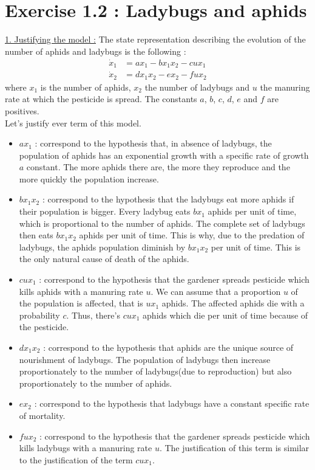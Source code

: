 \section*{Exercise 1.2 : Ladybugs and aphids}
\underline{1. Justifying the model :}
The state representation describing the evolution of the number of aphids and ladybugs is the following :
\begin{align*}
\dot{x}_1 & = ax_1 - bx_1x_2 - cux_1\\
\dot{x}_2 & = dx_1x_2 - ex_2 - fux_2
\end{align*}
where $x_1$ is the number of aphids, $x_2$ the number of ladybugs and $u$ the manuring rate at which the pesticide is spread. The constants $a$, $b$, $c$, $d$, $e$ and $f$ are positives.\\
Let's justify ever term of this model.
\begin{itemize}
\item $ax_1$ : correspond to the hypothesis that, in absence of ladybugs, the population of aphids has an exponential growth with a specific rate of growth $a$ constant. The more aphids there are, the more they reproduce and the more quickly the population increase.
\item $bx_1x_2$ : correspond to the hypothesis that the ladybugs eat more aphids if their population is bigger. Every ladybug eats $bx_1$ aphids per unit of time, which is proportional to the number of aphids. The complete set of ladybugs then eats $bx_1x_2$ aphids per unit of time. This is why, due to the predation of ladybugs, the aphids population diminish by $bx_1x_2$ per unit of time. This is the only natural cause of death of the aphids.
\item $cux_1$ : correspond to the hypothesis that the gardener spreads pesticide which kills aphids with a manuring rate $u$. We can assume that a proportion $u$ of the population is affected, that is $ux_1$ aphids. The affected aphids die with a probability $c$. Thus, there's $cux_1$ aphids which die per unit of time because of the pesticide.
\item $dx_1x_2$ : correspond to the hypothesis that aphids are the unique source of nourishment of ladybugs. The population of ladybugs then increase proportionately to the number of ladybugs(due to reproduction) but also proportionately to the number of aphids.
\item $ex_2$ : correspond to the hypothesis that ladybugs have a constant specific rate of mortality.
\item $fux_2$ : correspond to the hypothesis that the gardener spreads pesticide which kills ladybugs with a manuring rate $u$. The justification of this term is similar to the justification of the term $cux_1$.\\
\end{itemize}

